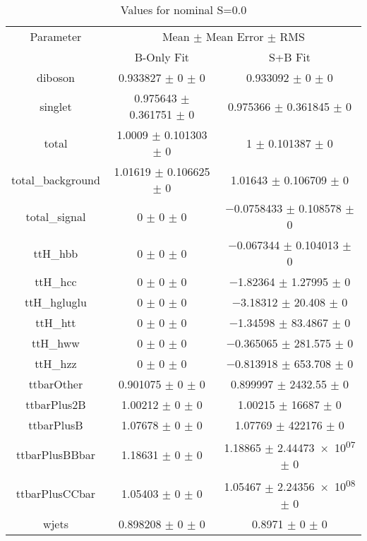 \begin{table}
\centering
\caption{Values for nominal S=0.0}
\begin{tabular}{ccc}
\toprule
Parameter & \multicolumn{2}{c}{Mean $\pm$ Mean Error $\pm$ RMS}\\
 & B-Only Fit & S+B Fit\\
\midrule
diboson & \num{0.933827} $\pm$ \num{0} $\pm$ \num{0} & \num{0.933092} $\pm$ \num{0} $\pm$ \num{0}\\
singlet & \num{0.975643} $\pm$ \num{0.361751} $\pm$ \num{0} & \num{0.975366} $\pm$ \num{0.361845} $\pm$ \num{0}\\
total & \num{1.0009} $\pm$ \num{0.101303} $\pm$ \num{0} & \num{1} $\pm$ \num{0.101387} $\pm$ \num{0}\\
total\_background & \num{1.01619} $\pm$ \num{0.106625} $\pm$ \num{0} & \num{1.01643} $\pm$ \num{0.106709} $\pm$ \num{0}\\
total\_signal & \num{0} $\pm$ \num{0} $\pm$ \num{0} & \num{-0.0758433} $\pm$ \num{0.108578} $\pm$ \num{0}\\
ttH\_hbb & \num{0} $\pm$ \num{0} $\pm$ \num{0} & \num{-0.067344} $\pm$ \num{0.104013} $\pm$ \num{0}\\
ttH\_hcc & \num{0} $\pm$ \num{0} $\pm$ \num{0} & \num{-1.82364} $\pm$ \num{1.27995} $\pm$ \num{0}\\
ttH\_hgluglu & \num{0} $\pm$ \num{0} $\pm$ \num{0} & \num{-3.18312} $\pm$ \num{20.408} $\pm$ \num{0}\\
ttH\_htt & \num{0} $\pm$ \num{0} $\pm$ \num{0} & \num{-1.34598} $\pm$ \num{83.4867} $\pm$ \num{0}\\
ttH\_hww & \num{0} $\pm$ \num{0} $\pm$ \num{0} & \num{-0.365065} $\pm$ \num{281.575} $\pm$ \num{0}\\
ttH\_hzz & \num{0} $\pm$ \num{0} $\pm$ \num{0} & \num{-0.813918} $\pm$ \num{653.708} $\pm$ \num{0}\\
ttbarOther & \num{0.901075} $\pm$ \num{0} $\pm$ \num{0} & \num{0.899997} $\pm$ \num{2432.55} $\pm$ \num{0}\\
ttbarPlus2B & \num{1.00212} $\pm$ \num{0} $\pm$ \num{0} & \num{1.00215} $\pm$ \num{16687} $\pm$ \num{0}\\
ttbarPlusB & \num{1.07678} $\pm$ \num{0} $\pm$ \num{0} & \num{1.07769} $\pm$ \num{422176} $\pm$ \num{0}\\
ttbarPlusBBbar & \num{1.18631} $\pm$ \num{0} $\pm$ \num{0} & \num{1.18865} $\pm$ \num{2.44473e+07} $\pm$ \num{0}\\
ttbarPlusCCbar & \num{1.05403} $\pm$ \num{0} $\pm$ \num{0} & \num{1.05467} $\pm$ \num{2.24356e+08} $\pm$ \num{0}\\
wjets & \num{0.898208} $\pm$ \num{0} $\pm$ \num{0} & \num{0.8971} $\pm$ \num{0} $\pm$ \num{0}\\
\bottomrule
\end{tabular}
\end{table}
